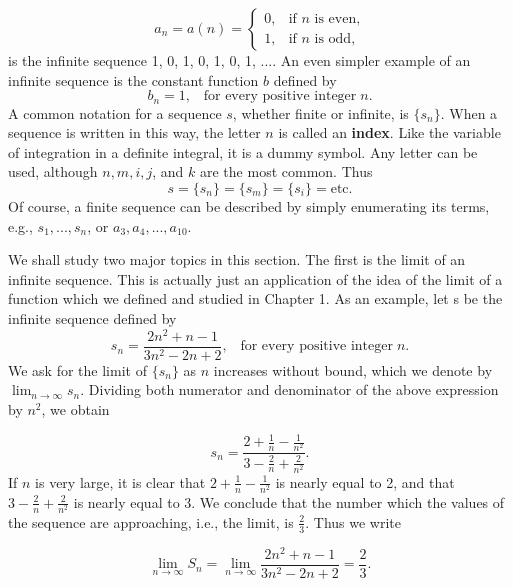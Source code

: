 \begin{equation}
a_{n} = a(n) = \left\{  \begin{array}{ll}
                                 0, & \mbox{if $n$ is even,} \\
                                 1, & \mbox{if $n$ is odd,}
                                 \end{array}
                       \right.
\label{eq4.2.1}
\end{equation}
\noindent is the infinite sequence 1, 0, 1, 0, 1, 0, 1, .... An even simpler example of an infinite sequence is the constant function $b$ defined by
$$
b_n = 1, \;\;\;\mbox{for every positive integer}\; n.
$$
A common notation for a sequence $s$, whether finite or infinite, is $\{ s_n \}$. When a sequence is written in this way, the letter $n$ is called an \textbf{index}.  Like the variable of integration in a definite integral, it is a dummy symbol. Any letter can be used, although $n, m, i, j$, and $k$ are the most common. Thus
$$
s = \{ s_n \} = \{ s_m \} = \{ s_i \} = \mbox{etc.}
$$
Of course, a finite sequence can be described by simply enumerating its terms, e.g., $s_1, . . ., s_n$, 
or $a_3, a_4, . . ., a_{10}$.

We shall study two major topics in this section. The first is the limit of an infinite sequence.  This is actually just an application of the idea of the limit of a function which we defined and studied in Chapter 1. As an example, let s be the infinite sequence defined by
$$
s_n = \frac{2n^2 + n - 1}{3n^2 - 2n + 2}, \;\;\;  \mbox{for every positive integer}\; n.
$$
\noindent We ask for the limit of $\{ s_n \}$ as $n$ increases without bound, which we denote by $\lim_{n \rightarrow \infty} s_n$. Dividing both numerator and denominator of the above expression by $n^2$, we obtain 

$$
s_n = \frac{2 + \frac{1}{n} - \frac{1}{n^2}}{3 - \frac{2}{n} + \frac{2}{n^2}}.
$$
\noindent If $n$ is very large, it is clear that $2 + \frac{1}{n} - \frac{1}{n^2}$ is nearly equal to 2, and that $3 - \frac{2}{n} + \frac{2}{n^2}$ is nearly equal to 3. We conclude that the number which the values of the sequence are approaching, i.e., the limit, is $\frac{2}{3}$. Thus we write

$$
\lim_{n \rightarrow \infty} S_n = \lim_{n \rightarrow \infty}  \frac{2n^2 + n - 1}{3n^2 - 2n + 2} = \frac{2}{3}.
$$

